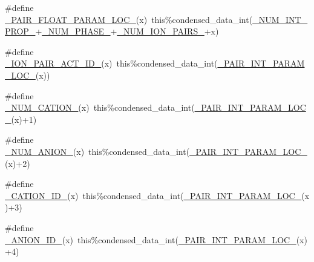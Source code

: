 \begin{DoxyCompactItemize}
\item 
\#define \mbox{\hyperlink{rxn___p_d_fi_t_e__activity_8_f90_a870d0d577e7b4aa4f6ff26a97bef9a71}{\+\_\+\+P\+A\+I\+R\+\_\+\+F\+L\+O\+A\+T\+\_\+\+P\+A\+R\+A\+M\+\_\+\+L\+O\+C\+\_\+}}(x)~this\%condensed\+\_\+data\+\_\+int(\mbox{\hyperlink{sub__model___u_n_i_f_a_c_8_f90_a54f7194dc6a244f7eb7a78f88b3362ba}{\+\_\+\+N\+U\+M\+\_\+\+I\+N\+T\+\_\+\+P\+R\+O\+P\+\_\+}}+\mbox{\hyperlink{rxn___z_s_r__aerosol__water_8c_a98c0f2f4469a3e7669ed9b6a4428e562}{\+\_\+\+N\+U\+M\+\_\+\+P\+H\+A\+S\+E\+\_\+}}+\mbox{\hyperlink{rxn___p_d_fi_t_e__activity_8_f90_afceac9fd991600a9e8cbf3827069efd1}{\+\_\+\+N\+U\+M\+\_\+\+I\+O\+N\+\_\+\+P\+A\+I\+R\+S\+\_\+}}+x)
\item 
\#define \mbox{\hyperlink{rxn___p_d_fi_t_e__activity_8_f90_a70ddcd0de0602ed0deb4c5491f15d218}{\+\_\+\+I\+O\+N\+\_\+\+P\+A\+I\+R\+\_\+\+A\+C\+T\+\_\+\+I\+D\+\_\+}}(x)~this\%condensed\+\_\+data\+\_\+int(\mbox{\hyperlink{rxn___z_s_r__aerosol__water_8c_abbe1689f26b0329d94a96047259b5679}{\+\_\+\+P\+A\+I\+R\+\_\+\+I\+N\+T\+\_\+\+P\+A\+R\+A\+M\+\_\+\+L\+O\+C\+\_\+}}(x))
\item 
\#define \mbox{\hyperlink{rxn___p_d_fi_t_e__activity_8_f90_a1960d4ad84b15384265173072921fcc0}{\+\_\+\+N\+U\+M\+\_\+\+C\+A\+T\+I\+O\+N\+\_\+}}(x)~this\%condensed\+\_\+data\+\_\+int(\mbox{\hyperlink{rxn___z_s_r__aerosol__water_8c_abbe1689f26b0329d94a96047259b5679}{\+\_\+\+P\+A\+I\+R\+\_\+\+I\+N\+T\+\_\+\+P\+A\+R\+A\+M\+\_\+\+L\+O\+C\+\_\+}}(x)+1)
\item 
\#define \mbox{\hyperlink{rxn___p_d_fi_t_e__activity_8_f90_af03518d65d8697b2cb5dde604aabd423}{\+\_\+\+N\+U\+M\+\_\+\+A\+N\+I\+O\+N\+\_\+}}(x)~this\%condensed\+\_\+data\+\_\+int(\mbox{\hyperlink{rxn___z_s_r__aerosol__water_8c_abbe1689f26b0329d94a96047259b5679}{\+\_\+\+P\+A\+I\+R\+\_\+\+I\+N\+T\+\_\+\+P\+A\+R\+A\+M\+\_\+\+L\+O\+C\+\_\+}}(x)+2)
\item 
\#define \mbox{\hyperlink{rxn___p_d_fi_t_e__activity_8_f90_a8ed4c0224b1b4e640ec136e9ea13da8a}{\+\_\+\+C\+A\+T\+I\+O\+N\+\_\+\+I\+D\+\_\+}}(x)~this\%condensed\+\_\+data\+\_\+int(\mbox{\hyperlink{rxn___z_s_r__aerosol__water_8c_abbe1689f26b0329d94a96047259b5679}{\+\_\+\+P\+A\+I\+R\+\_\+\+I\+N\+T\+\_\+\+P\+A\+R\+A\+M\+\_\+\+L\+O\+C\+\_\+}}(x)+3)
\item 
\#define \mbox{\hyperlink{rxn___p_d_fi_t_e__activity_8_f90_ac0e0149b40991d7d67e516de0fe35800}{\+\_\+\+A\+N\+I\+O\+N\+\_\+\+I\+D\+\_\+}}(x)~this\%condensed\+\_\+data\+\_\+int(\mbox{\hyperlink{rxn___z_s_r__aerosol__water_8c_abbe1689f26b0329d94a96047259b5679}{\+\_\+\+P\+A\+I\+R\+\_\+\+I\+N\+T\+\_\+\+P\+A\+R\+A\+M\+\_\+\+L\+O\+C\+\_\+}}(x)+4)

\end{DoxyCompactItemize}

